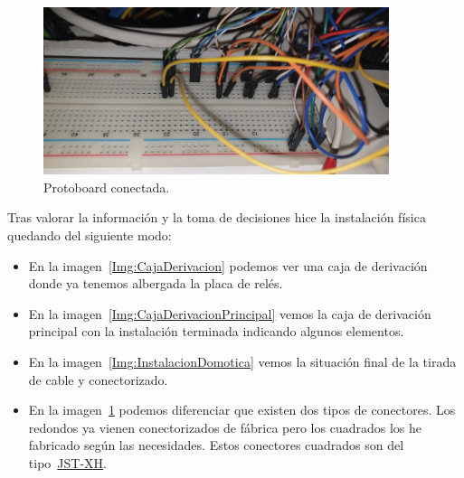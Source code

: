 \begin{figure}
    \centering
    \includegraphics[width=0.9\textwidth]{img/fotos/protoboard-instalada.jpeg}
    \caption{Protoboard conectada.} \label{Img:ProtoboardConecada}
\end{figure}

Tras valorar la información y la toma de decisiones hice la instalación física quedando del siguiente modo:
\begin{itemize}
    \item En la imagen~\ref{Img:CajaDerivacion} podemos ver una caja de derivación donde ya tenemos albergada la placa de relés. 
    \item En la imagen~\ref{Img:CajaDerivacionPrincipal} vemos la caja de derivación principal con la instalación terminada indicando algunos elementos.
    \item En la imagen~\ref{Img:InstalacionDomotica} vemos la situación final de la tirada de cable y conectorizado.
    \item En la imagen~\ref{Img:ProtoboardConecada} podemos diferenciar que existen dos tipos de conectores. Los redondos ya vienen conectorizados de fábrica pero los cuadrados los he fabricado según las necesidades. Estos conectores cuadrados son del tipo~\href{https://ae01.alicdn.com/kf/H4205e9c4ec4c4be4864e44b6925a22bdf/10-juegos-de-conector-de-Cable-de-2-54mm-XH2-54-conector-XH-macho-y-hembra.jpg_Q90.jpg_.webp}{JST-XH}.
\end{itemize}

